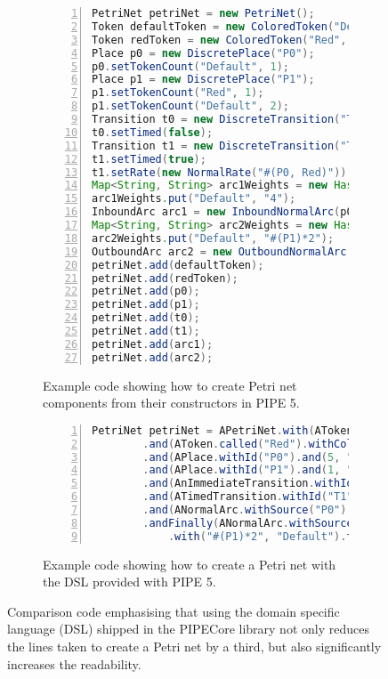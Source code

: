 \begin{figure}[tb]
\centering
\begin{subfigure}[b]{\linewidth}
\vspace{0.5cm}
\begin{lstlisting}[numbers=left, language=Java, frame=single]
PetriNet petriNet = new PetriNet();
Token defaultToken = new ColoredToken("Default", Color.BLACK);
Token redToken = new ColoredToken("Red", Color.RED);
Place p0 = new DiscretePlace("P0");
p0.setTokenCount("Default", 1);
Place p1 = new DiscretePlace("P1");
p1.setTokenCount("Red", 1);
p1.setTokenCount("Default", 2);
Transition t0 = new DiscreteTransition("T0");
t0.setTimed(false);
Transition t1 = new DiscreteTransition("T1");
t1.setTimed(true);
t1.setRate(new NormalRate("#(P0, Red)"));
Map<String, String> arc1Weights = new HashMap<>();
arc1Weights.put("Default", "4");
InboundArc arc1 = new InboundNormalArc(p0, t0, arc1Weights);
Map<String, String> arc2Weights = new HashMap<>();
arc2Weights.put("Default", "#(P1)*2");
OutboundArc arc2 = new OutboundNormalArc(t0, p0, arc2Weights);
petriNet.add(defaultToken);
petriNet.add(redToken);
petriNet.add(p0);
petriNet.add(p1);
petriNet.add(t0);
petriNet.add(t1);
petriNet.add(arc1);
petriNet.add(arc2);
\end{lstlisting}
\caption{Example code showing how to create Petri net components from their constructors in PIPE 5.}
\end{subfigure}

\begin{subfigure}[b]{\linewidth}
\vspace{0.5cm}
\begin{lstlisting}[numbers=left,language=Java,frame=single]
PetriNet petriNet = APetriNet.with(AToken.called("Default").withColor(Color.BLACK))
        .and(AToken.called("Red").withColor(Color.RED))
        .and(APlace.withId("P0").and(5, "Default").tokens())
        .and(APlace.withId("P1").and(1, "Red").and(2, "Default").to())
        .and(AnImmediateTransition.withId("T0"))
        .and(ATimedTransition.withId("T1").andRate("#(P0, Red)"))
        .and(ANormalArc.withSource("P0").andTarget("T0").and("4", "Default").tokens())
        .andFinally(ANormalArc.withSource("T0").andTarget("P0")
            .with("#(P1)*2", "Default").tokens());
\end{lstlisting}
\caption{Example code showing how to create a Petri net with the DSL provided with PIPE 5.}
\end{subfigure}

\caption{Comparison code emphasising that using the domain specific language (DSL) shipped in the PIPECore library not only reduces the lines taken to create a Petri net by a third, but also significantly increases the readability.}
\label{lst:dsl}
\end{figure}

